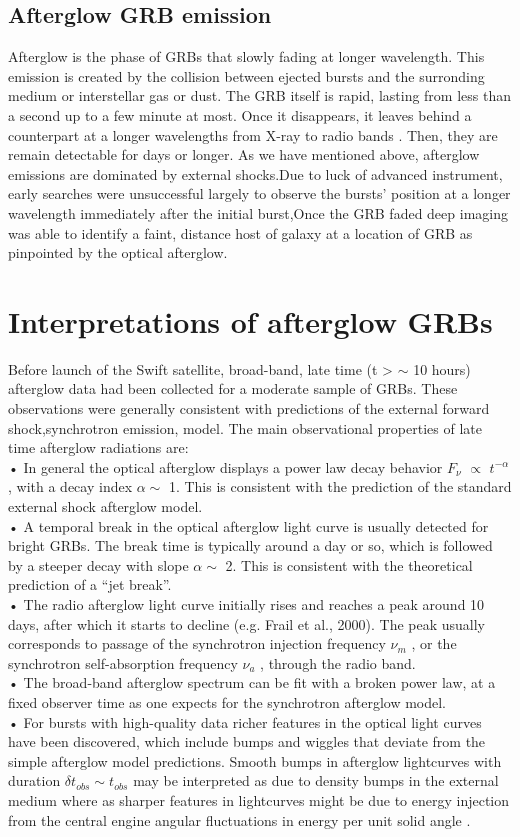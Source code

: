 \subsection{Afterglow GRB emission}
Afterglow is the phase of GRBs that slowly fading at longer wavelength. This
emission is created by the collision between ejected bursts and the surronding
medium or interstellar gas or dust. The GRB itself is rapid, lasting from less than a second up to a few minute at most. Once it disappears, it leaves behind a counterpart
at a longer wavelengths from X-ray to radio bands . Then, they are remain
detectable for days or longer. As we have mentioned above, afterglow emissions are
dominated by external shocks.Due to luck of advanced instrument, early searches
were unsuccessful largely to observe the bursts’ position at a longer wavelength
immediately after the initial burst,Once the GRB faded deep imaging was able to
identify a faint, distance host of galaxy at a location of GRB as pinpointed by the
optical afterglow.\citep{15}\citep{22}\citep{23} 
\section{Interpretations of afterglow GRBs}
Before launch of the Swift satellite, broad-band, late time (t > $ \sim $ 10 hours) afterglow data had been collected for a moderate sample of GRBs. These observations were generally consistent with predictions of the external forward shock,synchrotron emission, model. The main observational properties of late time afterglow radiations are:\\
• In general the optical afterglow displays a power law decay behavior $ F_{\nu} $ $ \propto $ $ t^{-\alpha} $   , with a decay index $ \alpha \sim $ 1. This is consistent with the prediction of the standard external shock afterglow model.\\
• A temporal break in the optical afterglow light curve is usually detected for bright GRBs. The break time is typically around a day or so, which is followed by a steeper decay with slope $ \alpha  \sim $ 2. This is consistent with the theoretical prediction of a “jet break”.\\
• The radio afterglow light curve initially rises and reaches a peak around
10 days, after which it starts to decline (e.g. Frail et al., 2000). The peak
usually corresponds to passage of the synchrotron injection frequency $ \nu_{m} $ ,
or the synchrotron self-absorption frequency $ \nu_{a} $ , through the radio band.\\
• The broad-band afterglow spectrum can be fit with a broken power law, at
a fixed observer time as one expects for the synchrotron afterglow model.\\
• For bursts with high-quality data richer features in the optical light curves have been discovered, which include bumps and wiggles that deviate from the simple afterglow model predictions. Smooth bumps in afterglow lightcurves with duration $ \delta  t _{obs}  \sim  t_{obs} $ may be interpreted as due to density bumps in the external medium  where as sharper features in lightcurves might be due to energy injection from the central engine  angular fluctuations in energy per unit solid angle \citep{18}.
